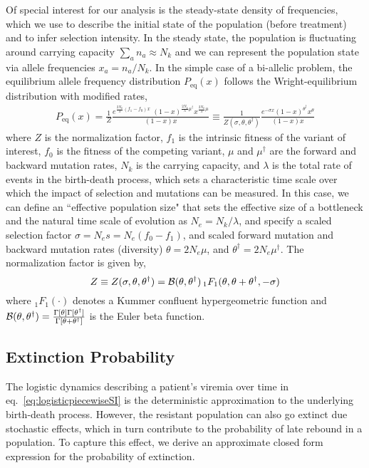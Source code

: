 \documentclass[11pt]{article}
\newcommand{\EQ}{\begin{equation}}
\newcommand{\EE}{\end{equation}}
\begin{document}
Of special interest for our analysis is the steady-state density of frequencies, which we use to describe the initial state of the population (before treatment) and to infer selection intensity. In the steady state, the population is fluctuating around carrying capacity $\sum_a n_a \approx N_k$ and we can represent the population state via allele frequencies $x_a = n_a/N_k$. In the simple  case of a bi-allelic  problem, the equilibrium allele frequency distribution $P_\text{eq}(x)$ follows the Wright-equilibrium distribution \cite{crowIntroductionPopulationGenetics2010} with modified rates,
\begin{align}
P_\text{eq}(x) = \frac{1}{Z} \frac{ e^{\frac{2N_k }{\lambda} (f_1 - f_0)  x}\,\, (1-x)^{\frac{2N_k }{\lambda}\mu^\dagger} x^{{\frac{2N_k }{\lambda}}\mu}}{(1-x)x} \equiv \frac{1}{Z(\sigma,\theta,\theta^\dagger)} \frac{ e^{ -\sigma x} (1-x)^{\theta^\dagger} x^{\theta} }{(1-x)x} 
\label{P_eq:SI}
\end{align}  
where $Z$ is the normalization factor,  $f_1$ is the intrinsic fitness of the variant of interest, $f_0$ is the fitness of the competing variant, $\mu$ and $\mu^\dagger$ are the forward and backward mutation rates, $N_k$ is the carrying capacity, and $\lambda$ is the total rate of events in the birth-death process, which sets a characteristic time scale over which the impact of selection and mutations can be measured. In this case, we can define an ``effective population size" that sets the effective size of a bottleneck and the natural time scale of  evolution as $N_e= N_k/\lambda$, and specify a scaled selection factor $\sigma = N_e s = N_e ( f_0- f_1)$, and scaled forward  mutation and backward mutation rates (diversity) $\theta = 2N_e \mu$, and $\theta^\dagger = 2N_e \mu^\dagger$. The normalization factor is given by, 
\EQ
Z\equiv Z(\sigma,\theta,\theta^\dagger) = {\cal B} (\theta,\theta^\dagger)\,   _{1} F_1(\theta,\theta+\theta^\dagger, -\sigma)
\label{eq.normEq:SI}
\EE
where $_{1} F_1(\cdot)$ denotes a Kummer confluent hypergeometric function and ${\cal B} (\theta,\theta^\dagger) = \frac{\Gamma[\theta] \Gamma[\theta^\dagger]}{\Gamma[\theta+\theta^\dagger]}$ is the Euler beta function.


\subsection{Extinction Probability}
The logistic dynamics describing a patient's viremia over time  in eq.~\ref{eq:logisticpiecewiseSI} is the deterministic approximation to the underlying birth-death process. However, the resistant population can also go extinct due stochastic effects, which  in turn contribute to  the probability of late rebound in a population. To capture this effect, we derive an approximate closed form expression for the probability of extinction.
\end{document}
